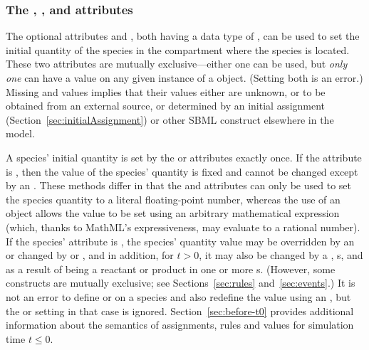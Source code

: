 \subsubsection{The ,
  , and  attributes}
\label{sec:initialAmount}
\label{sec:species-substanceunits}

The optional attributes  and
, both having a data type of
, can be used to set the initial quantity of the
species in the compartment where the species is located.  These
two attributes are mutually exclusive---either one can be used,
but \emph{only one} can have a value on any given instance of a
\Species object.  (Setting both is an error.)
Missing  and
 values implies that their values
either are unknown, or to be obtained from an external source, or
determined by an initial assignment
(Section~\ref{sec:initialAssignment}) or other SBML construct
elsewhere in the model.

A species' initial quantity is set by the  or
 attributes exactly once.  If the
 attribute is , then the value of the
species' quantity is fixed and cannot be changed except by an
\InitialAssignment.  These methods differ in that the
 and  attributes
can only be used to set the species quantity to a literal
floating-point number, whereas the use of an \InitialAssignment
object allows the value to be set using an arbitrary mathematical
expression (which, thanks to MathML's expressiveness, may evaluate
to a rational number).  If the species'  attribute
is , the species' quantity value may be overridden by
an \InitialAssignment or changed by \AssignmentRule or
\AlgebraicRule, and in addition, for $t > 0$, it may also be
changed by a \RateRule, \Event{}s, and as a result of being a
reactant or product in one or more \Reaction{}s.  (However, some
constructs are mutually exclusive; see Sections~\ref{sec:rules}
and~\ref{sec:events}.)  It is not an error to define
 or  on a species
and also redefine the value using an \InitialAssignment, but the
 or  setting in
that case is ignored.  Section~\ref{sec:before-t0} provides
additional information about the semantics of assignments, rules
and values for simulation time $t \leq 0$.

